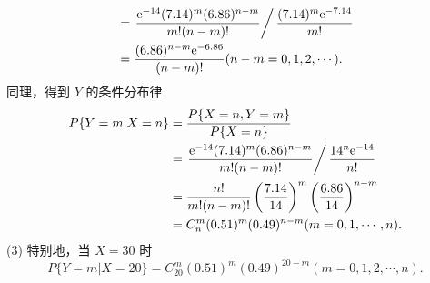 \begin{solution}
$$\begin{aligned}
             & = \left. \frac{\mathrm{e}^{-14}(7.14)^m(6.86)^{n-m}}{m!(n-m)!} \right/ \frac{(7.14)^m\mathrm{e}^{-7.14}}{m!} \\
             & = \frac{(6.86)^{n-m}\mathrm{e}^{-6.86}}{(n-m)!}
            (n-m = 0, 1, 2, \cdots).
        \end{aligned}
    $$
    同理，得到 $Y$ 的条件分布律
    $$
        \begin{aligned}
            P\{Y=m|X=n\}
             & = \frac{P\{X=n,Y=m\}}{P\{X=n\}}                                                                       \\
             & = \left.\frac{\mathrm{e}^{-14}(7.14)^m(6.86)^{n-m}}{m!(n-m)!} \right/ \frac{14^n\mathrm{e}^{-14}}{n!} \\
             & = \frac{n!}{m!(n-m)!}\left(\frac{7.14}{14}\right)^m\left(\frac{6.86}{14}\right)^{n-m}                 \\
             & = C_n^m(0.51)^m(0.49)^{n-m}
            (m = 0, 1, \cdots, n).
        \end{aligned}
    $$
    (3) 特别地，当 $X=30$ 时
    $$
        P\{Y=m|X=20\} = C_{20}^{m} (0.51)^m(0.49)^{20-m}
        (m = 0, 1, 2, \cdots, n).
    $$
\end{solution}


